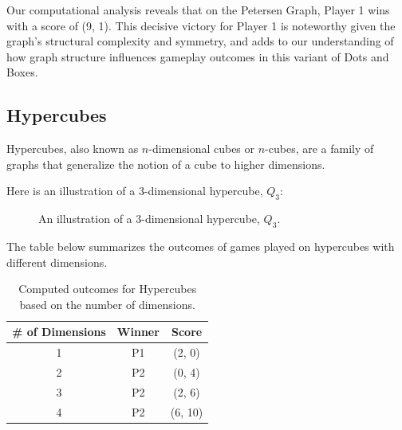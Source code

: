 \documentclass{article}
\begin{document}
Our computational analysis reveals that on the Petersen Graph, Player 1 wins with a score of (9, 1). This decisive victory for Player 1 is noteworthy given the graph's structural complexity and symmetry, and adds to our understanding of how graph structure influences gameplay outcomes in this variant of Dots and Boxes.

\subsection{Hypercubes}

Hypercubes, also known as $n$-dimensional cubes or $n$-cubes, are a family of graphs that generalize the notion of a cube to higher dimensions.

Here is an illustration of a 3-dimensional hypercube, $Q_3$:

\begin{figure}[hbt!]
\centering
{}
\caption{An illustration of a 3-dimensional hypercube, $Q_3$.}
\label{fig:hypercube}
\end{figure}
\FloatBarrier 

The table below summarizes the outcomes of games played on hypercubes with different dimensions. 

\begin{table}[hbt!]
\centering
\begin{tabular}{|c|c|c|}
\hline
\textbf{\# of Dimensions} & \textbf{Winner} & \textbf{Score} \\
\hline
1 & P1 & (2, 0) \\
2 & P2 & (0, 4) \\
3 & P2 & (2, 6) \\
4 & P2 & (6, 10) \\
\hline
\end{tabular}
\caption{Computed outcomes for Hypercubes based on the number of dimensions.}
\label{table:hypercubes-outcome}
\end{table}
\FloatBarrier 
\end{document}
